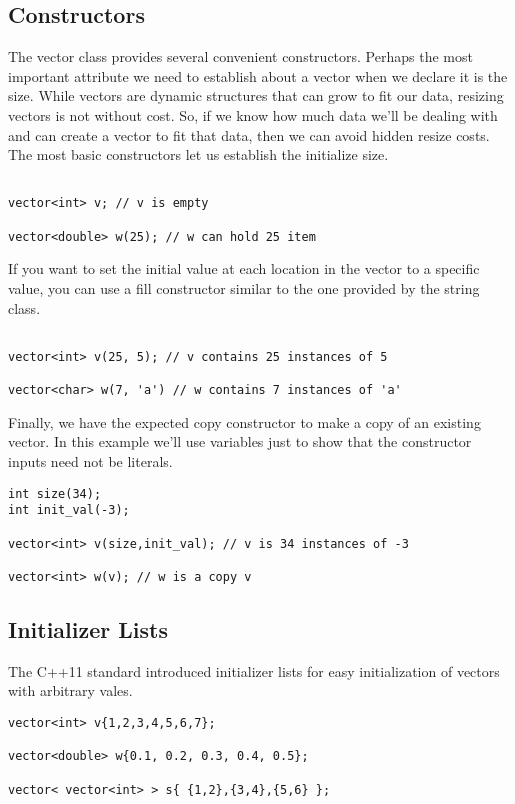 \documentclass[]{tufte-handout}
\begin{document}
\subsection{Constructors}

The vector class provides several convenient constructors. Perhaps the most important attribute we need to establish about a vector when we declare it is the size.  While vectors are dynamic structures that can grow to fit our data, resizing vectors is not without cost.  So, if we know how much data we'll be dealing with and can create a vector to fit that data, then we can avoid hidden resize costs. The most basic constructors let us establish the initialize size. 

\begin{verbatim}

vector<int> v; // v is empty

vector<double> w(25); // w can hold 25 item

\end{verbatim}

If you want to set the initial value at each location in the vector to a specific value, you can use a fill constructor similar to the one provided by the string class.

\begin{verbatim}

vector<int> v(25, 5); // v contains 25 instances of 5

vector<char> w(7, 'a') // w contains 7 instances of 'a'

\end{verbatim}

Finally, we have the expected copy constructor to make a copy of an existing vector. In this example we'll use variables just to show that the constructor inputs need not be literals.

\begin{verbatim}
int size(34);
int init_val(-3);

vector<int> v(size,init_val); // v is 34 instances of -3

vector<int> w(v); // w is a copy v
\end{verbatim}

\subsection{Initializer Lists}

The C++11 standard introduced initializer lists for easy initialization of vectors with arbitrary vales.
\begin{verbatim}
vector<int> v{1,2,3,4,5,6,7};

vector<double> w{0.1, 0.2, 0.3, 0.4, 0.5};

vector< vector<int> > s{ {1,2},{3,4},{5,6} };
\end{verbatim} 
\end{document}
